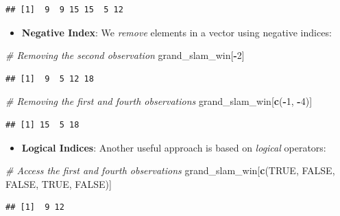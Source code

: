 \documentclass[12pt,]{krantz}
\newenvironment{Shaded}{\begin{snugshade}}{\end{snugshade}}
\newcommand{\KeywordTok}[1]{\textcolor[rgb]{0.27,0.27,0.27}{\textbf{#1}}}
\newcommand{\DecValTok}[1]{\textcolor[rgb]{0.06,0.06,0.06}{#1}}
\newcommand{\CommentTok}[1]{\textcolor[rgb]{0.37,0.37,0.37}{\textit{#1}}}
\newcommand{\OtherTok}[1]{\textcolor[rgb]{0.37,0.37,0.37}{#1}}
\newcommand{\OperatorTok}[1]{\textcolor[rgb]{0.43,0.43,0.43}{\textbf{#1}}}
\newcommand{\NormalTok}[1]{#1}
\providecommand{\tightlist}{%
  \setlength{\itemsep}{0pt}\setlength{\parskip}{0pt}}
\begin{document}
\begin{verbatim}
## [1]  9  9 15 15  5 12
\end{verbatim}

\begin{itemize}
\tightlist
\item
  \textbf{Negative Index}: We \emph{remove} elements in a vector using
  negative indices:
\end{itemize}

\begin{Shaded}
\begin{Highlighting}[]
\CommentTok{# Removing the second observation}
\NormalTok{grand_slam_win[}\OperatorTok{-}\DecValTok{2}\NormalTok{]}
\end{Highlighting}
\end{Shaded}

\begin{verbatim}
## [1]  9  5 12 18
\end{verbatim}

\begin{Shaded}
\begin{Highlighting}[]
\CommentTok{# Removing the first and fourth observations}
\NormalTok{grand_slam_win[}\KeywordTok{c}\NormalTok{(}\OperatorTok{-}\DecValTok{1}\NormalTok{, }\OperatorTok{-}\DecValTok{4}\NormalTok{)]}
\end{Highlighting}
\end{Shaded}

\begin{verbatim}
## [1] 15  5 18
\end{verbatim}

\begin{itemize}
\tightlist
\item
  \textbf{Logical Indices}: Another useful approach is based on
  \emph{logical} operators:
\end{itemize}

\begin{Shaded}
\begin{Highlighting}[]
\CommentTok{# Access the first and fourth observations}
\NormalTok{grand_slam_win[}\KeywordTok{c}\NormalTok{(}\OtherTok{TRUE}\NormalTok{, }\OtherTok{FALSE}\NormalTok{, }\OtherTok{FALSE}\NormalTok{, }\OtherTok{TRUE}\NormalTok{, }\OtherTok{FALSE}\NormalTok{)]}
\end{Highlighting}
\end{Shaded}

\begin{verbatim}
## [1]  9 12
\end{verbatim}
\end{document}
